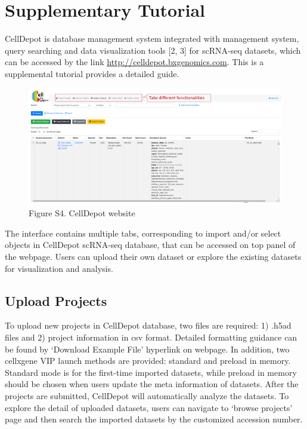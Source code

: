 \documentclass[
]{book}
\begin{document}
\hypertarget{SITutorial}{%
\chapter{Supplementary Tutorial}\label{SITutorial}}

CellDepot is database management system integrated with management system, query searching and data visualization tools {[}2, 3{]} for scRNA-seq datasets, which can be accessed by the link \url{http://celldepot.bxgenomics.com}. This is a supplemental tutorial provides a detailed guide.

\begin{figure}
\centering
\includegraphics{figures/S4.png}
\caption{Figure S4. CellDepot website}
\end{figure}

The interface contains multiple tabs, corresponding to import and/or select objects in CellDepot scRNA-seq database, that can be accessed on top panel of the webpage. Users can upload their own dataset or explore the existing datasets for visualization and analysis.

\hypertarget{upload-projects}{%
\section{Upload Projects}\label{upload-projects}}

To upload new projects in CellDepot database, two files are required: 1) .h5ad files and 2) project information in csv format. Detailed formatting guidance can be found by `Download Example File' hyperlink on webpage. In addition, two cellxgene VIP launch methods are provided: standard and preload in memory. Standard mode is for the first-time imported datasets, while preload in memory should be chosen when users update the meta information of datasets.
After the projects are submitted, CellDepot will automatically analyze the datasets. To explore the detail of uploaded datasets, users can navigate to `browse projects' page and then search the imported datasets by the customized accession number.
\end{document}
